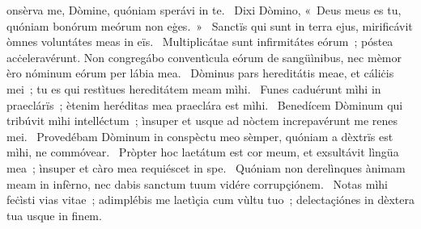 { }
{%
onsèrva me, Dòmine, quóniam sperávi in te. 
~Dixi Dòmino, «~Deus meus es tu, quóniam bonórum meórum non eġes.~»
~Sanctïs qui sunt in terra ejus, mirificávit òmnes voluntátes meas in eïs. 
~Multiplicátae sunt infirmitátes eórum~; póstea acċeleravérunt. Non congregábo conventìcula eórum de sangüìnibus, nec mèmor èro nóminum eórum per lábia mea. 
~Dòminus pars hereditátis meae, et cáliċis mei~; tu es qui restìtues hereditátem meam mìhi. 
~Funes caduérunt mìhi in praeclárïs~; ètenim heréditas mea praeclára est mìhi. 
~Benedícem Dòminum qui tribúvit mìhi intelléctum~; ìnsuper et usque ad nòctem increpavérunt me renes mei. 
~Provedébam Dòminum in conspèctu meo sèmper, quóniam a dèxtrïs est mìhi, ne commóvear. 
~Pròpter hoc laetátum est cor meum, et exsultávit lìngüa mea~; ìnsuper et càro mea requiéscet in spe. 
~Quóniam non derelìnques ànimam meam in infèrno, nec dabis sanctum tuum vidére corrupçiónem. 
~Notas mìhi feċìsti vias vitae~; adimplébis me laetìçia cum vùltu tuo~; delectaçiónes in dèxtera tua usque in finem. 
}
